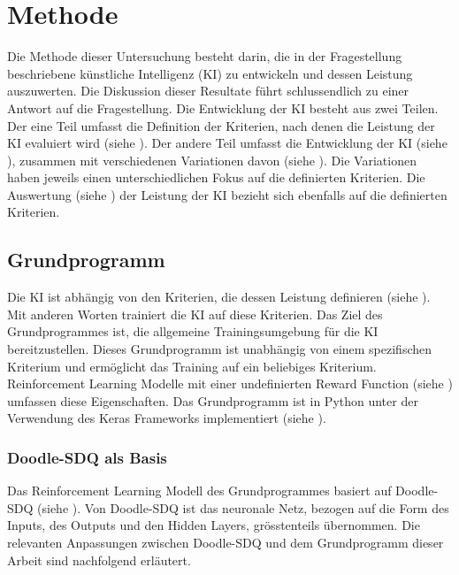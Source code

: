 \chapter{Methode}\label{chap:m}
Die Methode dieser Untersuchung besteht darin, die in der Fragestellung
beschriebene künstliche Intelligenz (KI) zu entwickeln und dessen Leistung
auszuwerten. Die Diskussion dieser Resultate führt schlussendlich zu einer
Antwort auf die Fragestellung. Die Entwicklung der KI besteht aus zwei Teilen.
Der eine Teil umfasst die Definition der Kriterien, nach denen die Leistung der
KI evaluiert wird (siehe ). Der andere Teil umfasst die
Entwicklung der KI (siehe ), zusammen mit verschiedenen
Variationen davon (siehe ). Die Variationen haben jeweils
einen unterschiedlichen Fokus auf die definierten Kriterien. Die Auswertung
(siehe ) der Leistung der KI bezieht sich ebenfalls
auf die definierten Kriterien.

\section{Grundprogramm}\label{chap:m_grund} Die KI ist abhängig von den
Kriterien, die dessen Leistung definieren (siehe ). Mit
anderen Worten trainiert die KI auf diese Kriterien. Das Ziel des
Grundprogrammes ist, die allgemeine Trainingsumgebung für die KI
bereitzustellen. Dieses Grundprogramm ist unabhängig von einem spezifischen
Kriterium und ermöglicht das Training auf ein beliebiges Kriterium.
Reinforcement Learning Modelle mit einer undefinierten Reward Function (siehe
) umfassen diese Eigenschaften. Das Grundprogramm ist
in Python unter der Verwendung des Keras Frameworks implementiert (siehe
). 

\subsection{Doodle-SDQ als Basis}\label{sub:m_grund_dood} Das Reinforcement
Learning Modell des Grundprogrammes basiert auf Doodle-SDQ (siehe
). Von Doodle-SDQ ist das neuronale Netz, bezogen auf
die Form des Inputs, des Outputs und den Hidden Layers, grösstenteils
übernommen. Die relevanten Anpassungen zwischen Doodle-SDQ und dem Grundprogramm
dieser Arbeit sind nachfolgend erläutert.

